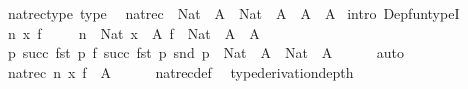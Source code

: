 \begin{isabellebody}
{\isafoldproof}%
%
\isadelimproof
\isanewline
%
\endisadelimproof
\isanewline
\isanewline
{}\isamarkupfalse%
\ nat{\isacharunderscore}{\kern0pt}rec{\isacharprime}{\kern0pt}{\isacharunderscore}{\kern0pt}type\ {\isacharbrackleft}{\kern0pt}type{\isacharbrackright}{\kern0pt}{\isacharcolon}{\kern0pt}\isanewline
\ \ {\isachardoublequoteopen}nat{\isacharunderscore}{\kern0pt}rec{\isacharprime}{\kern0pt}\ {\isacharcolon}{\kern0pt}\ Nat\ {\isasymRightarrow}\ A\ {\isasymRightarrow}\ {\isacharparenleft}{\kern0pt}Nat\ {\isasymRightarrow}\ A\ {\isasymRightarrow}\ A{\isacharparenright}{\kern0pt}\ {\isasymRightarrow}\ A{\isachardoublequoteclose}\isanewline
%
\isadelimproof
%
\endisadelimproof
%
\isatagproof
{}\isamarkupfalse%
\ {\isacharparenleft}{\kern0pt}intro\ Dep{\isacharunderscore}{\kern0pt}fun{\isacharunderscore}{\kern0pt}typeI{\isacharparenright}{\kern0pt}\isanewline
\ \ \isamarkupfalse%
\ n\ x\ f\isanewline
\ \ \isamarkupfalse%
\ \ {\isachardoublequoteopen}n\ {\isacharcolon}{\kern0pt}\ Nat{\isachardoublequoteclose}\ {\isachardoublequoteopen}x\ {\isacharcolon}{\kern0pt}\ A{\isachardoublequoteclose}\ {\isachardoublequoteopen}f\ {\isacharcolon}{\kern0pt}\ Nat\ {\isasymRightarrow}\ A\ {\isasymRightarrow}\ A{\isachardoublequoteclose}\isanewline
\ \ \isamarkupfalse%
\ {\isachardoublequoteopen}{\isacharparenleft}{\kern0pt}{\isasymlambda}p{\isachardot}{\kern0pt}\ {\isasymlangle}succ\ {\isacharparenleft}{\kern0pt}fst\ p{\isacharparenright}{\kern0pt}{\isacharcomma}{\kern0pt}\ f\ {\isacharparenleft}{\kern0pt}succ\ {\isacharparenleft}{\kern0pt}fst\ p{\isacharparenright}{\kern0pt}{\isacharparenright}{\kern0pt}\ {\isacharparenleft}{\kern0pt}snd\ p{\isacharparenright}{\kern0pt}{\isasymrangle}{\isacharparenright}{\kern0pt}\ {\isacharcolon}{\kern0pt}\ Nat\ {\isasymtimes}\ A\ {\isasymRightarrow}\ Nat\ {\isasymtimes}\ A{\isachardoublequoteclose}\isanewline
\ \ \ \ \isamarkupfalse%
\ auto\isanewline
\ \ \isamarkupfalse%
\ \isamarkupfalse%
\ {\isachardoublequoteopen}nat{\isacharunderscore}{\kern0pt}rec{\isacharprime}{\kern0pt}\ n\ x\ f\ {\isacharcolon}{\kern0pt}\ A{\isachardoublequoteclose}\isanewline
\ \ \ \ \isamarkupfalse%
\ nat{\isacharunderscore}{\kern0pt}rec{\isacharprime}{\kern0pt}{\isacharunderscore}{\kern0pt}def\ \isamarkupfalse%
\ {\isacharbrackleft}{\kern0pt}{\isacharbrackleft}{\kern0pt}type{\isacharunderscore}{\kern0pt}derivation{\isacharunderscore}{\kern0pt}depth{\isacharequal}{\kern0pt}{}{\isacharbrackright}{\kern0pt}{\isacharbrackright}{\kern0pt}\isanewline

\end{isabellebody}
